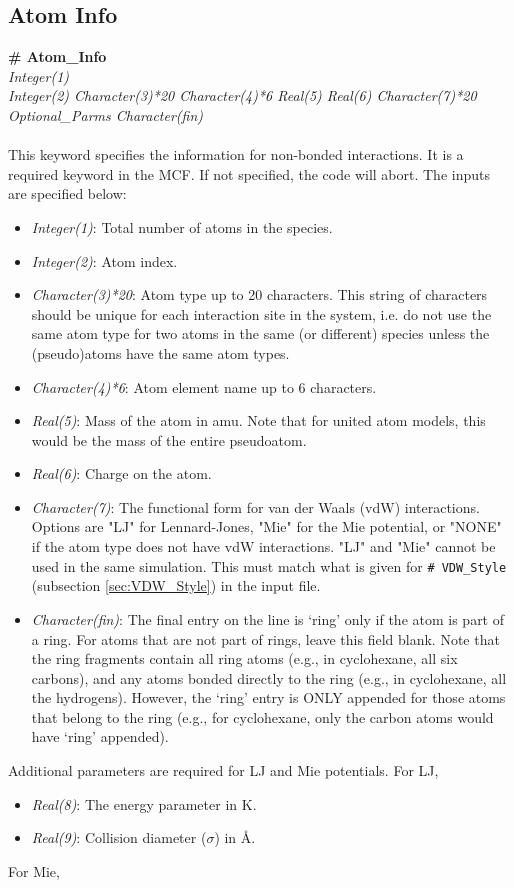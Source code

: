 \subsection{Atom Info}\label{sec:Get_Atom_Info}
%
{\bf \# Atom\_Info} \\
{\it Integer(1)} \\
{\it Integer(2)   Character(3)*20  Character(4)*6   Real(5)   Real(6)
  Character(7)*20     Optional\_Parms  Character(fin)} \\ \\
%
This keyword specifies the information for non-bonded interactions.
It is a required keyword in the MCF. If not specified, the code will abort. The inputs are specified below:
%
\begin{itemize}
%
\item {\it Integer(1)}: Total number of atoms in the species.
%
\item {\it Integer(2)}: Atom index.
%
\item {\it Character(3)*20}: Atom type up to 20 characters. This string of characters should be
unique for each interaction site in the system, i.e. do not use the same atom type
for two atoms in the same (or different) species unless the (pseudo)atoms have the same atom types.
%
\item {\it Character(4)*6}: Atom element name up to 6 characters.
%
\item {\it Real(5)}: Mass of the atom in amu. Note that for united atom models, this would be the
mass of the entire pseudoatom.
%
\item {\it Real(6)}: Charge on the atom.
%
\item {\it Character(7)}: The functional form for van der Waals (vdW) interactions.
Options are "LJ" for Lennard-Jones, "Mie" for the Mie potential,
or "NONE" if the atom type does not have vdW interactions.
"LJ" and "Mie" cannot be used in the same simulation.
This must match what is given for \texttt{\# VDW\_Style}
(subsection \ref{sec:VDW_Style}) in the input file.

\item {\it Character(fin)}: The final entry on the line is `ring' only if the atom is part
of a ring. For atoms that are not part of rings, leave this field blank. Note that the ring
fragments contain all ring atoms (e.g., in cyclohexane, all six carbons),
and any atoms bonded directly to the ring (e.g., in cyclohexane, all the hydrogens).
However, the `ring' entry is ONLY appended for those atoms that belong to the ring 
(e.g., for cyclohexane, only the carbon atoms would have `ring' appended).
\end{itemize}
Additional parameters are required for LJ and Mie potentials. For LJ,
%
\begin{itemize}
\item {\it Real(8)}: The energy parameter in K.
%
\item {\it Real(9)}: Collision diameter ($\sigma$)  in \AA.
\end{itemize}
%
For Mie,

